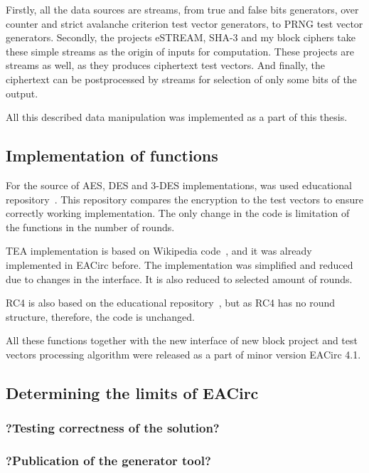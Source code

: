 \documentclass[
  print, %
  Table,   %
  nolof,     %
  nolot,     %
  draft, %
  11pt, %
  oneside  %
]{fithesis3}
\begin{document}
Firstly, all the data sources are streams, from true and false bits generators, over counter and strict avalanche criterion test vector generators, to PRNG test vector generators. Secondly, the projects eSTREAM, SHA-3 and my block ciphers take these simple streams as the origin of inputs for computation. These projects are streams as well, as they produces ciphertext test vectors. And finally, the ciphertext can be postprocessed by streams for selection of only some bits of the output.

All this described data manipulation was implemented as a part of this thesis.

\subsection{Implementation of functions}

For the source of AES, DES and 3-DES implementations, was used educational repository~\cite{cryptoFunc}. This repository compares the encryption to the test vectors to ensure correctly working implementation.  The only change in the code is limitation of the functions in the number of rounds.

TEA implementation is based on Wikipedia code~\cite{teaWiki}, and it was already implemented in EACirc before. The implementation was simplified and reduced due to changes in the interface. It is also reduced to selected amount of rounds.

RC4 is also based on the educational repository~\cite{cryptoFunc}, but as RC4 has no round structure, therefore, the code is unchanged.

All these functions together with the new interface of new block project and test vectors processing algorithm were released as a part of minor version EACirc 4.1.

\subsection{Determining the limits of EACirc}



\subsubsection{?Testing correctness of the solution?}
\subsubsection{?Publication of the generator tool?}
\end{document}
